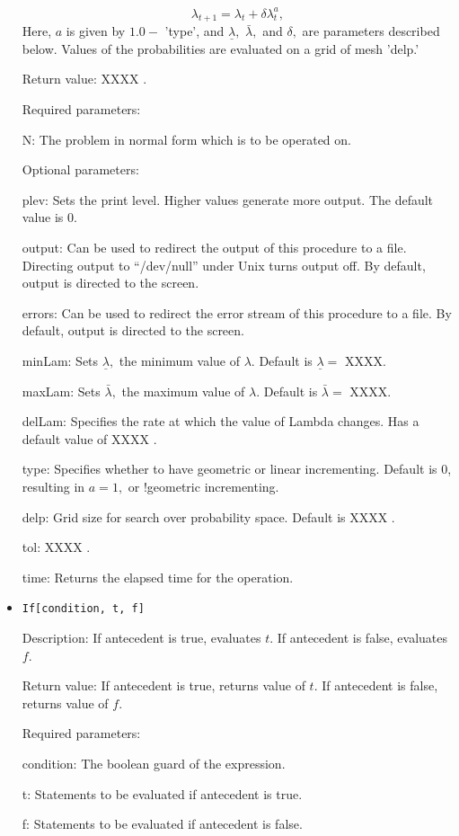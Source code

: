 \begin{itemize}
$$  
\lambda_{t+1} = \lambda_t +\delta \lambda_t^a,
$$ 
Here, $a$ is given by $1.0 - $ 'type', and $\underline\lambda,$
$\bar\lambda,$ and $\delta,$ are parameters described below.  Values
of the probabilities are evaluated on a grid of mesh 'delp.'

\item
[Return value:] XXXX .
\item
[Required parameters:]\hfil\null
	
\bd
\item  
[N:] The problem in normal form which is to be operated on.
\ed

\item
[Optional parameters:]\hfil\null

\bd
\item	
 [plev:] Sets the print level.  Higher values generate more output.
The default value is 0.
\item
[output:] Can be used to redirect the output of this procedure to a
file.  Directing output to ``/dev/null'' under Unix turns output off.
By default, output is directed to the screen.
\item
[errors:] Can be used to redirect the error stream of this procedure
to a file.  By default, output is directed to the screen.
\item
[minLam:] Sets $\underline\lambda,$ the minimum value of $\lambda.$
Default is $\underline\lambda = $ XXXX.
\item
[maxLam:]  Sets $\bar\lambda,$ the maximum value of $\lambda.$
Default is $\bar\lambda = $ XXXX.
\item
[delLam:] Specifies the rate at which the value of Lambda changes.
Has a default value of XXXX .
\item
[type:] Specifies whether to have geometric or linear incrementing.
Default is 0, resulting in $a = 1,$ or !geometric incrementing.
\item
[delp:] Grid size for search over probability space.  Default is XXXX .
\item
[tol:] XXXX .
\item
[time:] Returns the elapsed time for the operation.
\ed
\ed



\item 
\protect \large \begin{verbatim}
If[condition, t, f]
\end{verbatim} \normalsize
  
\bd
\item
[Description:] If antecedent is true, evaluates $t$.  If
antecedent is false, evaluates $f$. 
\item
[Return value:] If antecedent is true, returns value of $t$.  If
antecedent is false, returns value of $f$.  
\item
[Required parameters:]\hfil\null
\bd
\item
[condition:] The boolean guard of the expression.
\item
[t:] Statements to be evaluated if antecedent is true. 
\item
[f:] Statements to be evaluated if antecedent is false. 
\ed
\ed



\end{itemize}
